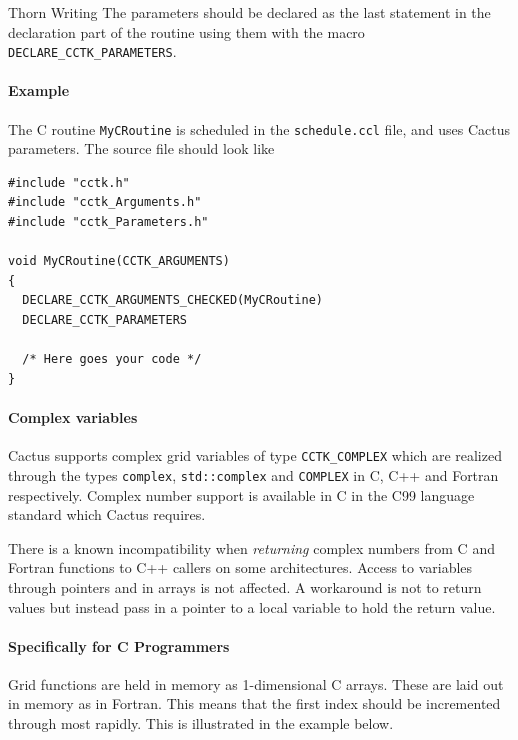 \begin{cactuspart}{Thorn Writing}
The parameters should be declared as the last statement in the declaration part
of the routine using them with the macro \texttt{DECLARE\_CCTK\_PARAMETERS}.

\paragraph{Example}

The C routine \verb|MyCRoutine| is scheduled in the \texttt{schedule.ccl} file,
and uses Cactus parameters. The source file should look like
\begin{verbatim}
#include "cctk.h"
#include "cctk_Arguments.h"
#include "cctk_Parameters.h"

void MyCRoutine(CCTK_ARGUMENTS)
{
  DECLARE_CCTK_ARGUMENTS_CHECKED(MyCRoutine)
  DECLARE_CCTK_PARAMETERS

  /* Here goes your code */
}
\end{verbatim}

\paragraph{Complex variables}

Cactus supports complex grid variables of type \texttt{CCTK\_COMPLEX} which
are realized through the types \texttt{complex}, \texttt{std::complex} and
\texttt{COMPLEX} in C, C++ and Fortran respectively. Complex number support is
available in C in the C99 language standard which Cactus requires.

There is a known incompatibility when \emph{returning} complex numbers from C
and Fortran functions to C++ callers on some architectures. Access to
variables through pointers and in arrays is not affected. A workaround is not
to return values but instead pass in a pointer to a local variable to hold the
return value.

\paragraph{Specifically for C Programmers}

Grid functions are held in memory as 1-dimensional C arrays. These are laid
out in memory as in Fortran. This means that the first index should
be incremented through most rapidly.  This is illustrated in the example
below.


\end{cactuspart}
